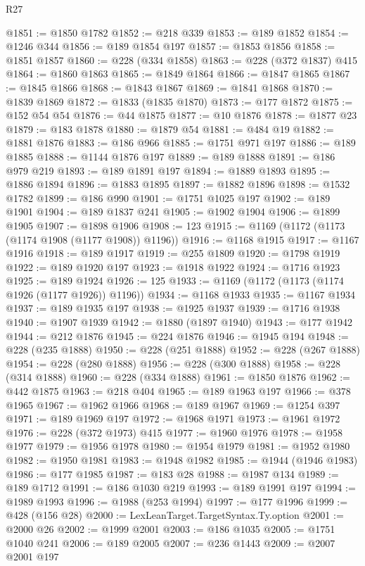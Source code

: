 \begin{lexlean}{R27}
\begin{coremodule}
@1851 := @1850 @1782
@1852 := @218 @339
@1853 := @189 @1852
@1854 := @1246 @344
@1856 := @189 @1854 @197
@1857 := @1853 @1856
@1858 := @1851 @1857
@1860 := @228 (@334 @1858)
@1863 := @228 (@372 @1837) @415
@1864 := @1860 @1863
@1865 := @1849 @1864
@1866 := @1847 @1865
@1867 := @1845 @1866
@1868 := @1843 @1867
@1869 := @1841 @1868
@1870 := @1839 @1869
@1872 := @1833 (@1835 @1870)
@1873 := @177 @1872
@1875 := @152 @54 @54
@1876 := @44 @1875
@1877 := @10 @1876
@1878 := @1877 @23
@1879 := @183 @1878
@1880 := @1879 @54
@1881 := @484 @19
@1882 := @1881 @1876
@1883 := @186 @966
@1885 := @1751 @971 @197
@1886 := @189 @1885
@1888 := @1144 @1876 @197
@1889 := @189 @1888
@1891 := @186 @979 @219
@1893 := @189 @1891 @197
@1894 := @1889 @1893
@1895 := @1886 @1894
@1896 := @1883 @1895
@1897 := @1882 @1896
@1898 := @1532 @1782
@1899 := @186 @990
@1901 := @1751 @1025 @197
@1902 := @189 @1901
@1904 := @189 @1837 @241
@1905 := @1902 @1904
@1906 := @1899 @1905
@1907 := @1898 @1906
@1908 := 123
@1915 := @1169 (@1172 (@1173 (@1174 @1908 (@1177 @1908)) @1196))
@1916 := @1168 @1915
@1917 := @1167 @1916
@1918 := @189 @1917
@1919 := @255 @1809
@1920 := @1798 @1919
@1922 := @189 @1920 @197
@1923 := @1918 @1922
@1924 := @1716 @1923
@1925 := @189 @1924
@1926 := 125
@1933 := @1169 (@1172 (@1173 (@1174 @1926 (@1177 @1926)) @1196))
@1934 := @1168 @1933
@1935 := @1167 @1934
@1937 := @189 @1935 @197
@1938 := @1925 @1937
@1939 := @1716 @1938
@1940 := @1907 @1939
@1942 := @1880 (@1897 @1940)
@1943 := @177 @1942
@1944 := @212 @1876
@1945 := @224 @1876
@1946 := @1945 @194
@1948 := @228 (@235 @1888)
@1950 := @228 (@251 @1888)
@1952 := @228 (@267 @1888)
@1954 := @228 (@280 @1888)
@1956 := @228 (@300 @1888)
@1958 := @228 (@314 @1888)
@1960 := @228 (@334 @1888)
@1961 := @1850 @1876
@1962 := @442 @1875
@1963 := @218 @404
@1965 := @189 @1963 @197
@1966 := @378 @1965
@1967 := @1962 @1966
@1968 := @189 @1967
@1969 := @1254 @397
@1971 := @189 @1969 @197
@1972 := @1968 @1971
@1973 := @1961 @1972
@1976 := @228 (@372 @1973) @415
@1977 := @1960 @1976
@1978 := @1958 @1977
@1979 := @1956 @1978
@1980 := @1954 @1979
@1981 := @1952 @1980
@1982 := @1950 @1981
@1983 := @1948 @1982
@1985 := @1944 (@1946 @1983)
@1986 := @177 @1985
@1987 := @183 @28
@1988 := @1987 @134
@1989 := @189 @1712
@1991 := @186 @1030 @219
@1993 := @189 @1991 @197
@1994 := @1989 @1993
@1996 := @1988 (@253 @1994)
@1997 := @177 @1996
@1999 := @428 (@156 @28)
@2000 := LexLeanTarget.TargetSyntax.Ty.option
@2001 := @2000 @26
@2002 := @1999 @2001
@2003 := @186 @1035
@2005 := @1751 @1040 @241
@2006 := @189 @2005
@2007 := @236 @1443
@2009 := @2007 @2001 @197

\end{coremodule}
\end{lexlean}
